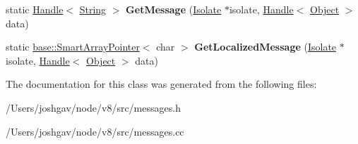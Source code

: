 \begin{DoxyCompactItemize}
\item 
static \hyperlink{classv8_1_1internal_1_1_handle}{Handle}$<$ \hyperlink{classv8_1_1internal_1_1_string}{String} $>$ {\bfseries Get\+Message} (\hyperlink{classv8_1_1internal_1_1_isolate}{Isolate} $\ast$isolate, \hyperlink{classv8_1_1internal_1_1_handle}{Handle}$<$ \hyperlink{classv8_1_1internal_1_1_object}{Object} $>$ data)\hypertarget{classv8_1_1internal_1_1_message_handler_a05c7290090b9628721213d335da8813c}{}\label{classv8_1_1internal_1_1_message_handler_a05c7290090b9628721213d335da8813c}

\item 
static \hyperlink{classv8_1_1base_1_1_smart_array_pointer}{base\+::\+Smart\+Array\+Pointer}$<$ char $>$ {\bfseries Get\+Localized\+Message} (\hyperlink{classv8_1_1internal_1_1_isolate}{Isolate} $\ast$isolate, \hyperlink{classv8_1_1internal_1_1_handle}{Handle}$<$ \hyperlink{classv8_1_1internal_1_1_object}{Object} $>$ data)\hypertarget{classv8_1_1internal_1_1_message_handler_af94a905baa676dcbf84eda0366cf085f}{}\label{classv8_1_1internal_1_1_message_handler_af94a905baa676dcbf84eda0366cf085f}

\end{DoxyCompactItemize}


The documentation for this class was generated from the following files\+:\begin{DoxyCompactItemize}
\item 
/\+Users/joshgav/node/v8/src/messages.\+h\item 
/\+Users/joshgav/node/v8/src/messages.\+cc\end{DoxyCompactItemize}
